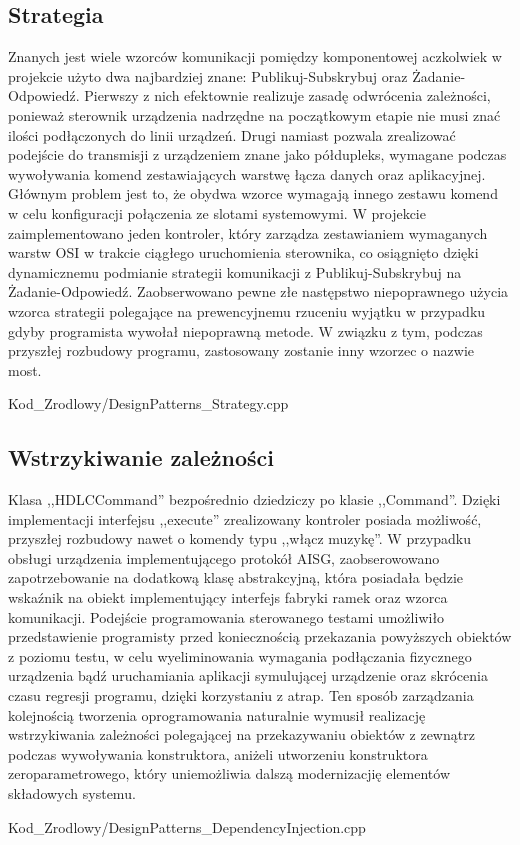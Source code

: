     \subsection{Strategia}
        Znanych jest wiele wzorców komunikacji pomiędzy komponentowej aczkolwiek w projekcie użyto dwa najbardziej znane: Publikuj-Subskrybuj oraz Żadanie-Odpowiedź.
        Pierwszy z nich efektownie realizuje zasadę odwrócenia zależności, ponieważ sterownik urządzenia nadrzędne na początkowym etapie nie musi znać
        ilości podłączonych do linii urządzeń. Drugi namiast pozwala zrealizować podejście do transmisji z urządzeniem znane jako półdupleks, wymagane podczas
        wywoływania komend zestawiających warstwę łącza danych oraz aplikacyjnej. Głównym problem jest to, że obydwa wzorce wymagają innego zestawu komend w celu
        konfiguracji połączenia ze slotami systemowymi. W projekcie zaimplementowano jeden kontroler, który zarządza zestawianiem wymaganych warstw OSI w trakcie
        ciągłego uruchomienia sterownika, co osiągnięto dzięki dynamicznemu podmianie strategii komunikacji z Publikuj-Subskrybuj na Żadanie-Odpowiedź.
        Zaobserwowano pewne złe następstwo niepoprawnego użycia wzorca strategii polegające na prewencyjnemu rzuceniu wyjątku w przypadku gdyby programista wywołał niepoprawną metode.
        W związku z tym, podczas przyszłej rozbudowy programu, zastosowany zostanie inny wzorzec o nazwie most. 
        
        {Kod_Zrodlowy/DesignPatterns_Strategy.cpp}
    \newpage
    \subsection{Wstrzykiwanie zależności}
        Klasa ,,HDLCCommand'' bezpośrednio dziedziczy po klasie ,,Command''. Dzięki implementacji interfejsu ,,execute'' zrealizowany kontroler posiada możliwość,
        przyszłej rozbudowy nawet o komendy typu ,,włącz muzykę''. W przypadku obsługi urządzenia implementującego protokół AISG, zaobserowowano zapotrzebowanie
        na dodatkową klasę abstrakcyjną, która posiadała będzie wskaźnik na obiekt implementujący interfejs fabryki ramek oraz wzorca komunikacji.
        Podejście programowania sterowanego testami umożliwiło przedstawienie programisty przed koniecznością przekazania powyższych obiektów z poziomu testu, w celu wyeliminowania
        wymagania podłączania fizycznego urządzenia bądź uruchamiania aplikacji symulującej urządzenie oraz skrócenia czasu regresji programu, dzięki
        korzystaniu z atrap.
        Ten sposób zarządzania kolejnością tworzenia oprogramowania naturalnie wymusił realizację wstrzykiwania zależności polegającej na
        przekazywaniu obiektów z zewnątrz podczas wywoływania konstruktora, aniżeli utworzeniu konstruktora zeroparametrowego, 
        który uniemożliwia dalszą modernizacjię elementów składowych systemu.
        
        {Kod_Zrodlowy/DesignPatterns_DependencyInjection.cpp}
